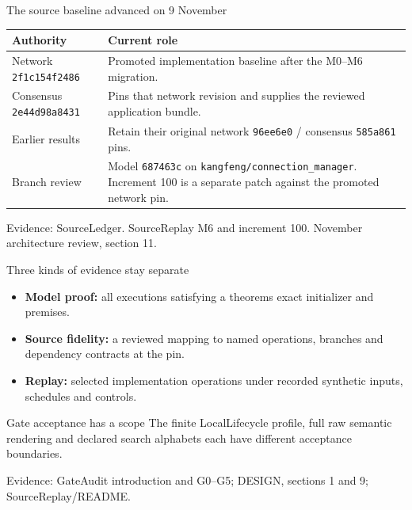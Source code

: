 \documentclass[11pt,aspectratio=169]{beamer}
\newcommand{\evidence}[1]{\vfill{\fontsize{7}{8}\selectfont\color{Muted}Evidence: #1\par}}
\newcommand{\code}[1]{\texttt{\small #1}}
\begin{document}
\begin{frame}{The source baseline advanced on 9 November}
\small\renewcommand{\arraystretch}{1.2}
\begin{tabularx}{\textwidth}{@{}P{28mm}Y@{}}
\toprule
Authority & Current role \\ \midrule
Network \code{2f1c154f2486} & Promoted implementation baseline after the M0--M6 migration. \\[2mm]
Consensus \code{2e44d98a8431} & Pins that network revision and supplies the reviewed application bundle. \\[2mm]
Earlier results & Retain their original network \code{96ee6e0} / consensus \code{585a861} pins. \\[2mm]
Branch review & Model \code{687463c} on \code{kangfeng/connection\_manager}. Increment 100 is a separate patch against the promoted network pin. \\[2mm]
\bottomrule
\end{tabularx}
\evidence{SourceLedger. SourceReplay M6 and increment 100. November architecture review, section 11.}
\end{frame}

\begin{frame}{Three kinds of evidence stay separate}
\begin{itemize}\setlength\itemsep{2.5mm}
\item \textbf{Model proof:} all executions satisfying a theorem\textquotesingle s exact initializer and premises.
\item \textbf{Source fidelity:} a reviewed mapping to named operations, branches and dependency contracts at the pin.
\item \textbf{Replay:} selected implementation operations under recorded synthetic inputs, schedules and controls.
\end{itemize}\begin{alertblock}{Gate acceptance has a scope}
The finite LocalLifecycle profile, full raw semantic rendering and declared search alphabets each have different acceptance boundaries.
\end{alertblock}
\evidence{GateAudit introduction and G0--G5; DESIGN, sections 1 and 9; SourceReplay/README.}
\end{frame}
\end{document}
